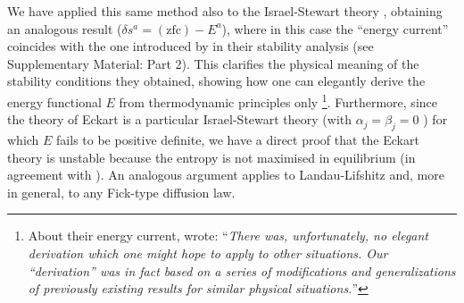 \documentclass[a4paper, amsfonts, amssymb, amsmath, reprint, showkeys, nofootinbib, twoside, onecolumn,notitlepage]{revtex4-1}
\begin{document}
We have applied this same method also to the Israel-Stewart theory \cite{Israel_Stewart_1979}, obtaining an analogous result ($\delta s^a = (\text{zfc})-E^a$), where in this case the ``energy current'' coincides with the one introduced by \citet{Hishcock1983} in their stability analysis (see Supplementary Material: Part 2).
This clarifies the physical meaning of the stability conditions they obtained, showing how one can elegantly derive the energy functional $E$ from thermodynamic principles only \footnote{About their energy current, \citet{Hishcock1983} wrote: ``\textit{There was, unfortunately, no elegant derivation which one might hope to apply to other situations. Our ``derivation'' was in fact based on a series of modifications and generalizations of previously existing results for similar physical situations.}''}. Furthermore, since the theory of Eckart is a particular Israel-Stewart theory (with $\alpha_j=\beta_j=0$ \cite{Hishcock1983}) for which $E$ fails to be positive definite, we have a direct proof that the Eckart theory is unstable because the entropy is not maximised in equilibrium (in agreement with \cite{GavassinoLyapunov_2020}). An analogous argument applies to Landau-Lifshitz and, more in general, to any Fick-type diffusion law.
\end{document}
